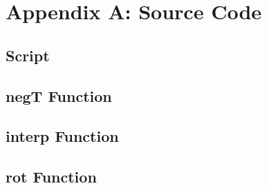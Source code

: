 \section{Appendix A: Source Code}

\subsection{Script}



\subsection{negT Function}



\subsection{interp Function}



\subsection{rot Function}


